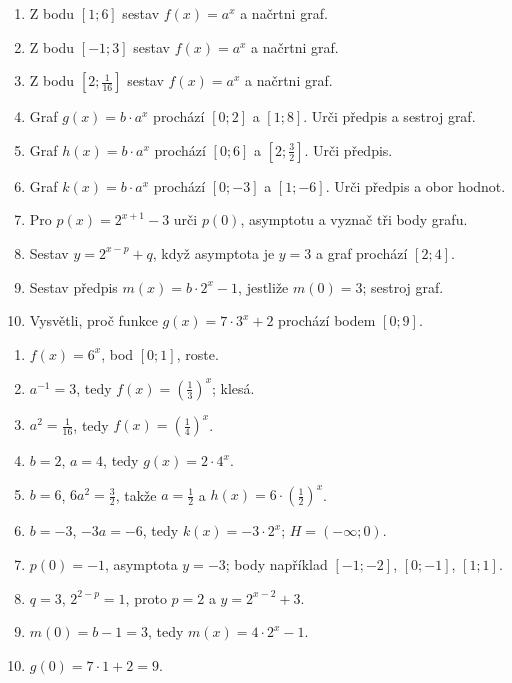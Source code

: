 \documentclass[11pt,a4paper]{article}
\begin{document}
\begin{zadaniReseniBox}[title={Samostatná práce 1}]
\begin{enumerate}[label=\alph*)]
\item Z bodu $[1;6]$ sestav $f(x)=a^x$ a načrtni graf.
\item Z bodu $[-1;3]$ sestav $f(x)=a^x$ a načrtni graf.
\item Z bodu $[2;\frac{1}{16}]$ sestav $f(x)=a^x$ a načrtni graf.
\item Graf $g(x)=b\cdot a^x$ prochází $[0;2]$ a $[1;8]$. Urči předpis a sestroj graf.
\item Graf $h(x)=b\cdot a^x$ prochází $[0;6]$ a $[2;\frac{3}{2}]$. Urči předpis.
\item Graf $k(x)=b\cdot a^x$ prochází $[0;-3]$ a $[1;-6]$. Urči předpis a obor hodnot.
\item Pro $p(x)=2^{x+1}-3$ urči $p(0)$, asymptotu a vyznač tři body grafu.
\item Sestav $y=2^{x-p}+q$, když asymptota je $y=3$ a graf prochází $[2;4]$.
\item Sestav předpis $m(x)=b\cdot2^x-1$, jestliže $m(0)=3$; sestroj graf.
\item Vysvětli, proč funkce $g(x)=7\cdot3^x+2$ prochází bodem $[0;9]$.
\end{enumerate}
\tcblower
\begin{enumerate}[label=\alph*)]
\item $f(x)=6^x$, bod $[0;1]$, roste.
\item $a^{-1}=3$, tedy $f(x)=\left(\frac{1}{3}\right)^x$; klesá.
\item $a^2=\frac{1}{16}$, tedy $f(x)=\left(\frac{1}{4}\right)^x$.
\item $b=2$, $a=4$, tedy $g(x)=2\cdot4^x$.
\item $b=6$, $6a^2=\frac{3}{2}$, takže $a=\frac{1}{2}$ a $h(x)=6\cdot\left(\frac{1}{2}\right)^x$.
\item $b=-3$, $-3a=-6$, tedy $k(x)=-3\cdot2^x$; $H=(-\infty;0)$.
\item $p(0)=-1$, asymptota $y=-3$; body například $[-1;-2]$, $[0;-1]$, $[1;1]$.
\item $q=3$, $2^{2-p}=1$, proto $p=2$ a $y=2^{x-2}+3$.
\item $m(0)=b-1=3$, tedy $m(x)=4\cdot2^x-1$.
\item $g(0)=7\cdot1+2=9$.
\end{enumerate}
\end{zadaniReseniBox}
\end{document}
